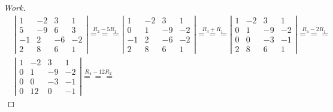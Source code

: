 \documentclass{article}
\begin{document}
\begin{proof}[Work]
    \begin{align*}
         & \left\lvert \begin{array}{cccc}
                           1  & -2 & 3  & 1  \\
                           5  & -9 & 6  & 3  \\
                           -1 & 2  & -6 & -2 \\
                           2  & 8  & 6  & 1
                       \end{array} \right\rvert \overset{R_2 - 5R_1}{===}
        \left\lvert \begin{array}{cccc}
                        1  & -2 & 3  & 1  \\
                        0  & 1  & -9 & -2 \\
                        -1 & 2  & -6 & -2 \\
                        2  & 8  & 6  & 1
                    \end{array} \right\rvert \overset{R_3 + R_1}{===}
        \left\lvert \begin{array}{cccc}
                        1 & -2 & 3  & 1  \\
                        0 & 1  & -9 & -2 \\
                        0 & 0  & -3 & -1 \\
                        2 & 8  & 6  & 1
                    \end{array} \right\rvert \overset{R_4 - 2R_1}{===}                       \\
         & \left\lvert \begin{array}{cccc}
                           1 & -2 & 3  & 1  \\
                           0 & 1  & -9 & -2 \\
                           0 & 0  & -3 & -1 \\
                           0 & 12 & 0  & -1
                       \end{array} \right\rvert \overset{R_4 - 12R_2}{===}

\end{align*}
\end{proof}
\end{document}
